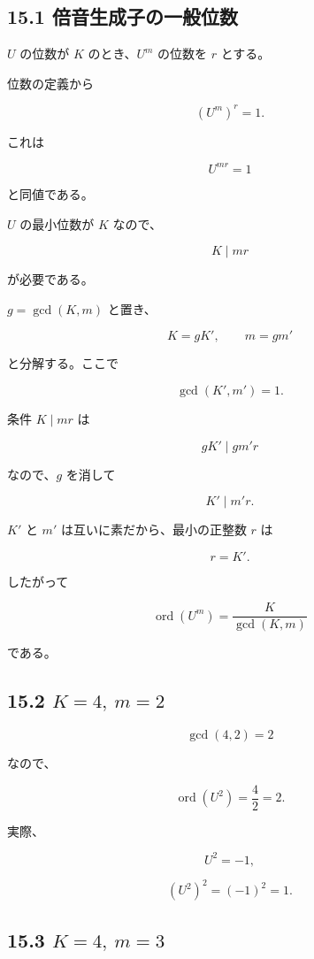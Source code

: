 \documentclass[
  a4paper,
]{ltjsarticle}
\begin{document}
\subsection{15.1
倍音生成子の一般位数}\label{ux500dux97f3ux751fux6210ux5b50ux306eux4e00ux822cux4f4dux6570}

\(U\) の位数が \(K\) のとき、\(U^m\) の位数を \(r\) とする。

位数の定義から

\[
(U^m)^r=1.
\]

これは

\[
U^{mr}=1
\]

と同値である。

\(U\) の最小位数が \(K\) なので、

\[
K\mid mr
\]

が必要である。

\(g=\gcd(K,m)\) と置き、

\[
K=gK',
\qquad
m=gm'
\]

と分解する。ここで

\[
\gcd(K',m')=1.
\]

条件 \(K\mid mr\) は

\[
gK'\mid gm'r
\]

なので、\(g\) を消して

\[
K'\mid m'r.
\]

\(K'\) と \(m'\) は互いに素だから、最小の正整数 \(r\) は

\[
r=K'.
\]

したがって

\[
\boxed{
\operatorname{ord}(U^m)
=
\frac{K}{\gcd(K,m)}
}
\]

である。

\subsection{\texorpdfstring{15.2
\(K=4,\ m=2\)}{15.2 K=4,\textbackslash{} m=2}}\label{k4-m2}

\[
\gcd(4,2)=2
\]

なので、

\[
\operatorname{ord}(U^2)
=
\frac{4}{2}
=2.
\]

実際、

\[
U^2=-1,
\]

\[
(U^2)^2=(-1)^2=1.
\]

\subsection{\texorpdfstring{15.3
\(K=4,\ m=3\)}{15.3 K=4,\textbackslash{} m=3}}\label{k4-m3}
\end{document}
